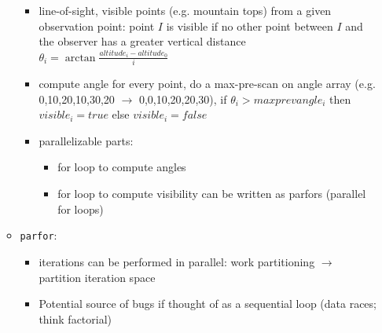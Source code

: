 \documentclass[a4paper]{article}
\newcommand{\inline}[1]{\lstinline!#1!}%
\begin{document}
\begin{itemize}
\begin{itemize}
\begin{itemize}
\item line-of-sight, visible points (e.g. mountain tops) from a given observation point: point $I$ is visible if no other point between $I$ and the observer has a greater vertical distance 
$\theta_i=\arctan\frac{altitude_i-altitude_0}{i}$
\item compute angle for every point, do a max-pre-scan on angle array (e.g. 0,10,20,10,30,20 $\rightarrow$ 0,0,10,20,20,30), if $\theta_i>maxprevangle_i$ then $visible_i  = true$ else $visible_i  =false$
\item parallelizable parts: 
\begin{itemize}
\item for loop to compute angles
\item for loop to compute visibility can be written as parfors (parallel for loops)
\end{itemize}
\end{itemize}
\item \inline{parfor}: 
\begin{itemize}
\item iterations can be performed in parallel: work partitioning $\rightarrow$ partition iteration space
\item Potential source of bugs if thought of as a sequential loop (data races; think factorial)
\end{itemize}
\end{itemize}
\end{itemize}
\end{document}
